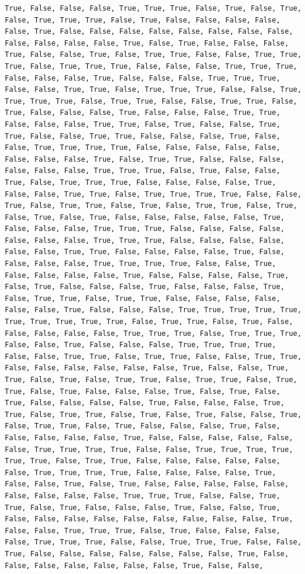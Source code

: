 \documentclass[
  letterpaper,
  DIV=11,
  numbers=noendperiod]{scrartcl}
\begin{document}
\begin{verbatim}
True, False, False, False, True, True, True, False, True, False, True, False, True, True, True, False, True, False, False, False, False, False, True, False, False, False, False, False, False, False, False, False, False, False, False, True, False, True, False, False, False, True, False, False, True, False, True, True, False, False, True, True, True, False, True, True, True, False, False, False, True, True, True, False, False, False, True, False, False, False, True, True, True, False, False, True, True, False, True, True, True, False, False, True, True, True, True, False, True, True, False, False, True, True, False, True, False, False, False, True, False, False, False, True, True, False, False, False, True, True, False, True, False, False, True, True, False, False, True, True, False, False, False, True, False, False, True, True, True, True, False, False, False, False, False, False, False, False, True, False, True, True, False, False, False, False, False, False, True, True, True, False, True, False, False, True, False, True, True, True, False, False, False, False, True, False, False, True, True, False, True, True, True, True, False, False, True, False, True, True, False, True, False, True, True, False, True, False, True, False, True, False, False, False, False, False, True, False, False, False, True, True, True, False, False, False, False, False, False, False, True, True, True, False, False, False, False, False, False, True, True, False, False, False, False, True, False, False, False, False, True, True, True, True, False, False, True, False, False, False, False, True, False, False, False, False, True, False, True, False, False, False, True, False, False, False, True, False, True, True, False, True, True, False, False, False, False, False, False, True, False, False, False, True, True, True, True, True, True, True, True, True, True, False, True, True, False, True, False, False, False, False, False, True, True, True, False, True, True, True, False, False, True, False, False, False, True, True, True, True, False, False, True, True, False, True, True, False, False, True, True, False, False, False, False, False, False, True, False, False, True, True, False, True, False, True, True, False, True, True, False, True, True, False, True, False, False, False, True, False, True, False, True, False, False, False, False, True, False, False, False, True, True, False, True, True, False, True, False, True, False, False, True, False, True, True, False, True, False, False, False, True, False, False, False, False, False, True, False, False, False, False, False, False, True, True, True, True, False, False, True, True, True, True, True, True, False, True, True, False, False, False, False, False, False, True, True, True, True, False, False, False, False, True, False, False, True, False, True, False, False, False, False, False, False, False, False, False, True, True, True, False, False, True, True, False, True, False, False, False, True, False, False, True, False, False, False, False, False, False, False, False, False, True, False, False, True, True, True, False, True, False, False, False, False, True, True, True, False, False, True, True, True, False, False, True, False, False, False, False, False, False, False, True, False, False, False, False, False, False, False, True, False, False, 
\end{verbatim}
\end{document}
